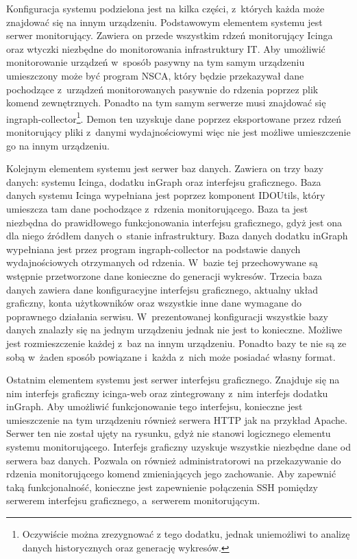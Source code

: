 Konfiguracja systemu podzielona jest na kilka części, z~których każda
może znajdować się na innym urządzeniu. Podstawowym elementem systemu
jest serwer monitorujący. Zawiera on przede wszystkim rdzeń
monitorujący Icinga oraz wtyczki niezbędne do monitorowania
infrastruktury IT. Aby umożliwić monitorowanie urządzeń w~sposób
pasywny na tym samym urządzeniu umieszczony może być program NSCA,
który będzie przekazywał dane pochodzące z~urządzeń monitorowanych
pasywnie do rdzenia poprzez plik komend zewnętrznych. Ponadto na tym
samym serwerze musi znajdować się
ingraph-collector\footnote{Oczywiście można zrezygnować z tego
  dodatku, jednak uniemożliwi to analizę danych historycznych oraz
  generację wykresów.}. Demon ten uzyskuje dane poprzez eksportowane
przez rdzeń monitorujący pliki z~danymi wydajnościowymi więc nie jest
możliwe umieszczenie go na innym urządzeniu.

Kolejnym elementem systemu jest serwer baz danych. Zawiera on trzy
bazy danych: systemu Icinga, dodatku inGraph oraz interfejsu
graficznego. Baza danych systemu Icinga wypełniana jest poprzez
komponent IDOUtils, który umieszcza tam dane pochodzące z~rdzenia
monitorującego. Baza ta jest niezbędna do prawidłowego funkcjonowania
interfejsu graficznego, gdyż jest ona dla niego źródłem danych
o~stanie infrastruktury. Baza danych dodatku inGraph wypełniana jest
przez program ingraph-collector na podstawie danych wydajnościowych
otrzymanych od rdzenia. W~bazie tej przechowywane są wstępnie
przetworzone dane konieczne do generacji wykresów. Trzecia baza danych
zawiera dane konfiguracyjne interfejsu graficznego, aktualny układ
graficzny, konta użytkowników oraz wszystkie inne dane wymagane do
poprawnego działania serwisu. W~prezentowanej konfiguracji wszystkie
bazy danych znalazły się na jednym urządzeniu jednak nie jest to
konieczne. Możliwe jest rozmieszczenie każdej z~baz na innym
urządzeniu. Ponadto bazy te nie są ze sobą w~żaden sposób powiązane
i~każda z~nich może posiadać własny format.

Ostatnim elementem systemu jest serwer interfejsu
graficznego. Znajduje się na nim interfejs graficzny icinga-web oraz
zintegrowany z~nim interfejs dodatku inGraph. Aby umożliwić
funkcjonowanie tego interfejsu, konieczne jest umieszczenie na tym
urządzeniu również serwera HTTP jak na przykład Apache. Serwer ten nie
został ujęty na rysunku, gdyż nie stanowi logicznego elementu systemu
monitorującego. Interfejs graficzny uzyskuje wszystkie niezbędne dane
od serwera baz danych. Pozwala on również administratorowi na
przekazywanie do rdzenia monitorującego komend zmieniających jego
zachowanie. Aby zapewnić taką funkcjonalność, konieczne jest
zapewnienie połączenia SSH pomiędzy serwerem interfejsu graficznego,
a~serwerem monitorującym.

